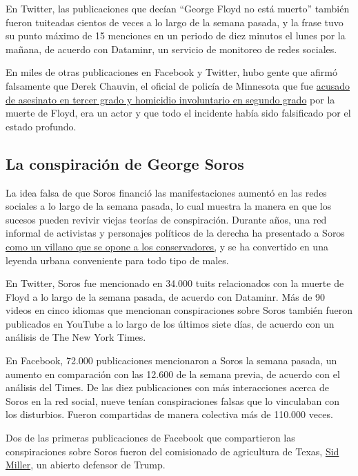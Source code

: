 En Twitter, las publicaciones que decían ``George Floyd no está muerto''
también fueron tuiteadas cientos de veces a lo largo de la semana
pasada, y la frase tuvo su punto máximo de 15 menciones en un periodo de
diez minutos el lunes por la mañana, de acuerdo con Dataminr, un
servicio de monitoreo de redes sociales.

En miles de otras publicaciones en Facebook y Twitter, hubo gente que
afirmó falsamente que Derek Chauvin, el oficial de policía de Minnesota
que fue
\href{https://www.nytimes3xbfgragh.onion/2020/05/29/us/minneapolis-police-george-floyd.html}{acusado
de asesinato en tercer grado y homicidio involuntario en segundo grado}
por la muerte de Floyd, era un actor y que todo el incidente había sido
falsificado por el estado profundo.

\hypertarget{la-conspiraciuxf3n-de-george-soros}{%
\subsection{La conspiración de George
Soros}\label{la-conspiraciuxf3n-de-george-soros}}

La idea falsa de que Soros financió las manifestaciones aumentó en las
redes sociales a lo largo de la semana pasada, lo cual muestra la manera
en que los sucesos pueden revivir viejas teorías de conspiración.
Durante años, una red informal de activistas y personajes políticos de
la derecha ha presentado a Soros
\href{https://www.nytimes3xbfgragh.onion/2018/05/29/us/roseanne-george-soros-twitter.html}{como
un villano que se opone a los conservadores,} y se ha convertido en una
leyenda urbana conveniente para todo tipo de males.

En Twitter, Soros fue mencionado en 34.000 tuits relacionados con la
muerte de Floyd a lo largo de la semana pasada, de acuerdo con Dataminr.
Más de 90 videos en cinco idiomas que mencionan conspiraciones sobre
Soros también fueron publicados en YouTube a lo largo de los últimos
siete días, de acuerdo con un análisis de The New York Times.

En Facebook, 72.000 publicaciones mencionaron a Soros la semana pasada,
un aumento en comparación con las 12.600 de la semana previa, de acuerdo
con el análisis del Times. De las diez publicaciones con más
interacciones acerca de Soros en la red social, nueve tenían
conspiraciones falsas que lo vinculaban con los disturbios. Fueron
compartidas de manera colectiva más de 110.000 veces.

Dos de las primeras publicaciones de Facebook que compartieron las
conspiraciones sobre Soros fueron del comisionado de agricultura de
Texas, \href{https://www.facebookcorewwwi.onion/MillerForTexas/}{Sid
Miller}, un abierto defensor de Trump.

